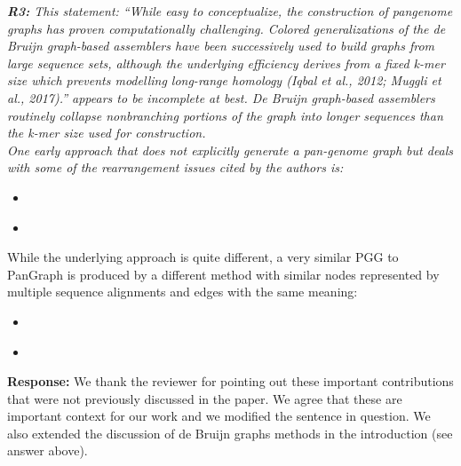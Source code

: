 \documentclass[aps,rmp,onecolumn]{revtex4-1}
\newcommand{\reviewer}[2]{{\it \textbf{#1:} #2\vskip 5mm}}
\newcommand{\response}[1]{{{\color{response}\textbf{Response:} #1}}\vskip 5mm}
\begin{document}
\reviewer{R3}{
      This statement: ``While easy to conceptualize, the construction of pangenome graphs has proven computationally challenging. Colored generalizations of the de Bruijn graph-based assemblers have been successively used to build graphs from large sequence sets, although the underlying efficiency derives from a fixed k-mer size which prevents modelling long-range homology (Iqbal et al., 2012; Muggli et al., 2017).'' appears to be incomplete at best. De Bruijn graph-based assemblers routinely collapse nonbranching portions of the graph into longer sequences than the k-mer size used for construction.\\
      One early approach that does not explicitly generate a pan-genome graph but deals with some of the rearrangement issues cited by the authors is:
      \begin{itemize}
            \item \cite{angiuoli2011improving}
            \item \cite{angiuoli2011mugsy}
      \end{itemize}
      While the underlying approach is quite different, a very similar PGG to PanGraph is produced by a different method with similar nodes represented by multiple sequence alignments and edges with the same meaning:
      \begin{itemize}
            \item \cite{sutton2021pan}
            \item \cite{chan2015novel}
      \end{itemize}}
\response{
We thank the reviewer for pointing out these important contributions that were not previously discussed in the paper.
We agree that these are important context for our work and we modified the sentence in question. We also extended the discussion of de Bruijn graphs methods in the introduction (see answer above).\\
}
\end{document}
